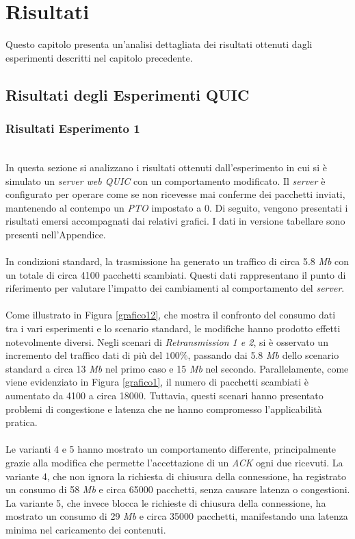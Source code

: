 \chapter{Risultati}
\label{cap:risultati}

Questo capitolo presenta un'analisi dettagliata dei risultati ottenuti dagli esperimenti descritti nel capitolo precedente.

\section{Risultati degli Esperimenti QUIC}
\subsection{Risultati Esperimento 1}
~\\
\indent In questa sezione si analizzano i risultati ottenuti dall'esperimento in cui si è simulato un \emph{server web QUIC} con un comportamento modificato. 
Il \emph{server} è configurato per operare come se non ricevesse mai conferme dei pacchetti inviati, mantenendo al contempo un \emph{PTO} impostato a 0. 
Di seguito, vengono presentati i risultati emersi accompagnati dai relativi grafici. I dati in versione tabellare sono presenti nell'Appendice.
\\\\
In condizioni standard, la trasmissione ha generato un traffico di circa 5.8 \emph{Mb} con un totale di circa 4100 pacchetti scambiati. 
Questi dati rappresentano il punto di riferimento per valutare l'impatto dei cambiamenti al comportamento del \emph{server}.
\\\\
Come illustrato in Figura \ref{grafico12}, che mostra il confronto del consumo dati tra i vari esperimenti e lo scenario standard, le modifiche hanno prodotto effetti notevolmente diversi.
Negli scenari di \emph{Retransmission 1 e 2}, si è osservato un incremento del traffico dati di più del $100\%$, passando dai 5.8 \emph{Mb} dello scenario standard a circa 13 \emph{Mb} nel primo caso e 15 \emph{Mb} nel secondo. 
Parallelamente, come viene evidenziato in Figura \ref{grafico1}, il numero di pacchetti scambiati è aumentato da 4100 a circa 18000. 
Tuttavia, questi scenari hanno presentato problemi di congestione e latenza che ne hanno compromesso l'applicabilità pratica.
\\\\
Le varianti 4 e 5 hanno mostrato un comportamento differente, principalmente grazie alla modifica che permette l'accettazione di un \emph{ACK} ogni due ricevuti.
La variante 4, che non ignora la richiesta di chiusura della connessione, ha registrato un consumo di 58 \emph{Mb} e circa 65000 pacchetti, senza causare latenza o congestioni. 
La variante 5, che invece blocca le richieste di chiusura della connessione, ha mostrato un consumo di 29 \emph{Mb} e circa 35000 pacchetti, manifestando una latenza minima nel caricamento dei contenuti.

